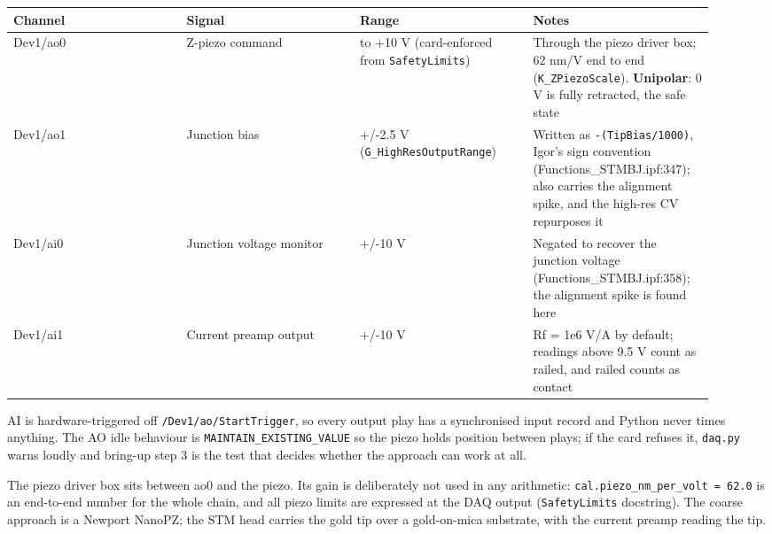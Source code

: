 \small\setlength{\LTleft}{0pt}\setlength{\LTright}{\fill}
\begin{longtable}{@{}>{\raggedright\arraybackslash}p{0.230\linewidth}>{\raggedright\arraybackslash}p{0.230\linewidth}>{\raggedright\arraybackslash}p{0.230\linewidth}>{\raggedright\arraybackslash}p{0.230\linewidth}@{}}
\toprule
\textbf{Channel} & \textbf{Signal} & \textbf{Range} & \textbf{Notes} \\
\midrule\endhead
Dev1/ao0 & Z-piezo command & 0 to +10 V (card-enforced from \texttt{Safety\discretionary{}{}{}Limits}) & Through the piezo driver box; 62 nm/V end to end (\texttt{K\_\discretionary{}{}{}ZPiezo\discretionary{}{}{}Scale}). \textbf{Unipolar}: 0 V is fully retracted, the safe state \\
Dev1/ao1 & Junction bias & +/-2.5 V (\texttt{G\_\discretionary{}{}{}High\discretionary{}{}{}Res\discretionary{}{}{}Output\discretionary{}{}{}Range}) & Written as \texttt{-(Tip\discretionary{}{}{}Bias/\discretionary{}{}{}1000)}, Igor's sign convention (Functions\_STMBJ.ipf:347); also carries the alignment spike, and the high-res CV repurposes it \\
Dev1/ai0 & Junction voltage monitor & +/-10 V & Negated to recover the junction voltage (Functions\_STMBJ.ipf:358); the alignment spike is found here \\
Dev1/ai1 & Current preamp output & +/-10 V & Rf = 1e6 V/A by default; readings above 9.5 V count as railed, and railed counts as contact \\
\bottomrule
\end{longtable}
\normalsize

AI is hardware-triggered off \texttt{/\discretionary{}{}{}Dev1/\discretionary{}{}{}ao/\discretionary{}{}{}Start\discretionary{}{}{}Trigger}, so every output play has a synchronised input record and Python never times anything. The AO idle behaviour is \texttt{MAINTAIN\_\discretionary{}{}{}EXISTING\_\discretionary{}{}{}VALUE} so the piezo holds position between plays; if the card refuses it, \texttt{daq.\discretionary{}{}{}py} warns loudly and bring-up step 3 is the test that decides whether the approach can work at all.

The piezo driver box sits between ao0 and the piezo. Its gain is deliberately not used in any arithmetic: \texttt{cal.\discretionary{}{}{}piezo\_\discretionary{}{}{}nm\_\discretionary{}{}{}per\_\discretionary{}{}{}volt = 62.\discretionary{}{}{}0} is an end-to-end number for the whole chain, and all piezo limits are expressed at the DAQ output (\texttt{Safety\discretionary{}{}{}Limits} docstring). The coarse approach is a Newport NanoPZ; the STM head carries the gold tip over a gold-on-mica substrate, with the current preamp reading the tip.

